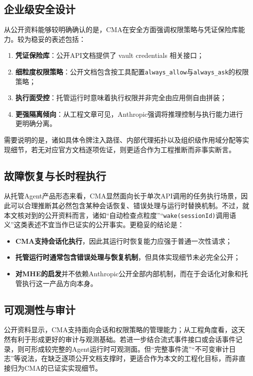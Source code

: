 \documentclass[12pt,a4paper]{ctexart}
\begin{document}
\subsection{企业级安全设计}

从公开资料能够较明确确认的是，CMA在安全方面强调权限策略与凭证保险库能力。较为稳妥的表述包括：

\begin{enumerate}
    \item \textbf{凭证保险库}：公开API文档提供了 vault credentials 相关接口；
    \item \textbf{细粒度权限策略}：公开文档包含按工具配置\texttt{always\_allow}与\texttt{always\_ask}的权限策略；
    \item \textbf{执行面受控}：托管运行时意味着执行权限并非完全由应用侧自由拼装；
    \item \textbf{更强隔离倾向}：从工程文章可见，Anthropic强调将推理控制与执行能力进行更明确分离。
\end{enumerate}

需要说明的是，诸如具体令牌注入路径、内部代理拓扑以及组织级作用域分配等实现细节，若无对应官方文档逐项佐证，则更适合作为工程推断而非事实断言。

\subsection{故障恢复与长时程执行}

从托管Agent产品形态来看，CMA显然面向长于单次API调用的任务执行场景，因此可以合理推断其必然包含某种会话恢复、错误处理与运行时替换机制。不过，就本文核对到的公开资料而言，诸如“自动检查点粒度”“\texttt{wake(sessionId)}调用语义”这类表述不宜当作已证实的公开事实。更稳妥的结论是：

\begin{itemize}
    \item \textbf{CMA支持会话化执行}，因此其运行时恢复能力应强于普通一次性请求；
    \item \textbf{托管运行时通常包含错误处理与恢复机制}，但具体实现细节未必完全公开；
    \item \textbf{对MHE的启发}并不依赖Anthropic公开全部内部机制，而在于会话化对象和托管执行这一产品方向本身。
\end{itemize}

\subsection{可观测性与审计}

公开资料显示，CMA支持面向会话和权限策略的管理能力；从工程角度看，这天然有利于形成更好的审计与观测基础。若进一步结合流式事件接口或会话事件记录，则可形成较完整的Agent运行时可观测面。但“完整事件流”“不可变审计日志”等说法，在缺乏逐项公开文档支撑时，更适合作为本文的工程化目标，而非直接归为CMA的已证实实现细节。
\end{document}
